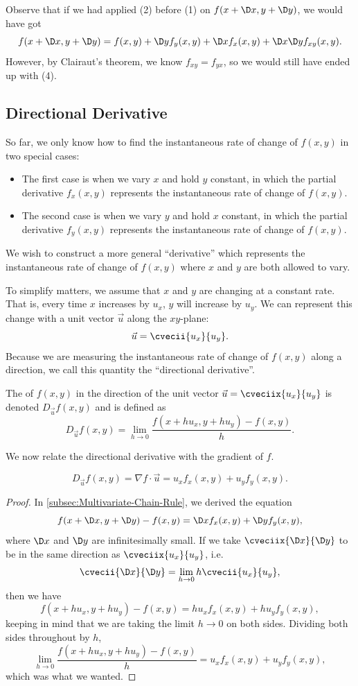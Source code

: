 Observe that if we had applied (2) before (1) on $f(x + \D x, y + \D y)$, we would have got \[f(x + \D x, y + \D y) = f(x, y) + \D y f_y(x,y) + \D x f_x(x, y) + \D x\D y f_{xy}(x, y).\] However, by Clairaut's theorem, we know $f_{xy} = f_{yx}$, so we would still have ended up with (4).

\subsection{Directional Derivative}

So far, we only know how to find the instantaneous rate of change of $f(x, y)$ in two special cases:
\begin{itemize}
    \item The first case is when we vary $x$ and hold $y$ constant, in which the partial derivative $f_x(x, y)$ represents the instantaneous rate of change of $f(x, y)$.
    \item The second case is when we vary $y$ and hold $x$ constant, in which the partial derivative $f_y(x, y)$ represents the instantaneous rate of change of $f(x, y)$.
\end{itemize}
We wish to construct a more general ``derivative'' which represents the instantaneous rate of change of $f(x, y)$ where $x$ and $y$ are both allowed to vary.

To simplify matters, we assume that $x$ and $y$ are changing at a constant rate. That is, every time $x$ increases by $u_x$, $y$ will increase by $u_y$. We can represent this change with a unit vector $\vec u$ along the $xy$-plane: \[\vec u = \cvecii{u_x}{u_y}.\] Because we are measuring the instantaneous rate of change of $f(x, y)$ along a direction, we call this quantity the ``directional derivative''.

\begin{definition}
    The  of $f(x, y)$ in the direction of the unit vector $\vec u = \cveciix{u_x}{u_y}$ is denoted $D_{\vec u} f(x, y)$ and is defined as \[D_{\vec u} f(x, y) = \lim_{h \to 0} \frac{f(x + h u_x, y + h u_y) - f(x, y)}{h}.\]
\end{definition}

We now relate the directional derivative with the gradient of $f$.

\begin{proposition}
    \[D_{\vec u} f(x, y) = \nabla f \cdot \vec u = u_x f_x(x, y) + u_y f_y (x, y).\]
\end{proposition}
\begin{proof}
    In \SS\ref{subsec:Multivariate-Chain-Rule}, we derived the equation \[f(x + \D x, y + \D y) - f(x, y) = \D x f_x(x, y) + \D y f_y(x, y),\] where $\D x$ and $\D y$ are infinitesimally small. If we take $\cveciix{\D x}{\D y}$ to be in the same direction as $\cveciix{u_x}{u_y}$, i.e. \[\cvecii{\D x}{\D y} = \lim_{h \to 0} h \cvecii{u_x}{u_y},\] then we have \[f(x + h u_x, y + h u_y) - f(x, y) = h u_x f_x(x, y) + h u_y f_y(x, y),\] keeping in mind that we are taking the limit $h \to 0$ on both sides. Dividing both sides throughout by $h$, \[\lim_{h \to 0} \frac{f(x + h u_x, y + h u_y) - f(x, y)}{h} = u_x f_x(x, y) + u_y f_y(x, y),\] which was what we wanted.
\end{proof}

